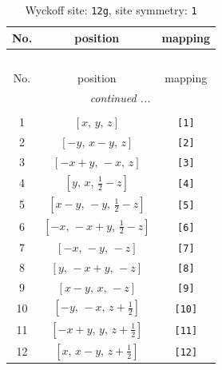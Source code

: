 \documentclass[fleqn,8pt]{jsarticle}
\begin{document}
\renewcommand{\arraystretch}{1.2}
\begin{longtable}{ccc}
\caption{Wyckoff site: {\tt 12g}, site symmetry: {\tt 1}}
 \\
 \hline \hline
No. & position & mapping \\ \hline \endfirsthead

\multicolumn{2}{l}{\tablename\ \thetable{}} \\
 \hline \hline
No. & position & mapping \\ \hline \endhead

 \hline \hline
\multicolumn{2}{r}{\footnotesize\it continued ...} \\ \endfoot

 \hline \hline
\multicolumn{2}{r}{} \\ \endlastfoot

1 & $\left[ x,\, y,\, z \right]$ & {\tt [1]} \\ \hline
2 & $\left[ - y,\, x - y,\, z \right]$ & {\tt [2]} \\ \hline
3 & $\left[ - x + y,\, - x,\, z \right]$ & {\tt [3]} \\ \hline
4 & $\left[ y,\, x,\, \frac{1}{2} - z \right]$ & {\tt [4]} \\ \hline
5 & $\left[ x - y,\, - y,\, \frac{1}{2} - z \right]$ & {\tt [5]} \\ \hline
6 & $\left[ - x,\, - x + y,\, \frac{1}{2} - z \right]$ & {\tt [6]} \\ \hline
7 & $\left[ - x,\, - y,\, - z \right]$ & {\tt [7]} \\ \hline
8 & $\left[ y,\, - x + y,\, - z \right]$ & {\tt [8]} \\ \hline
9 & $\left[ x - y,\, x,\, - z \right]$ & {\tt [9]} \\ \hline
10 & $\left[ - y,\, - x,\, z + \frac{1}{2} \right]$ & {\tt [10]} \\ \hline
11 & $\left[ - x + y,\, y,\, z + \frac{1}{2} \right]$ & {\tt [11]} \\ \hline
12 & $\left[ x,\, x - y,\, z + \frac{1}{2} \right]$ & {\tt [12]} \\
\end{longtable}
\end{document}
